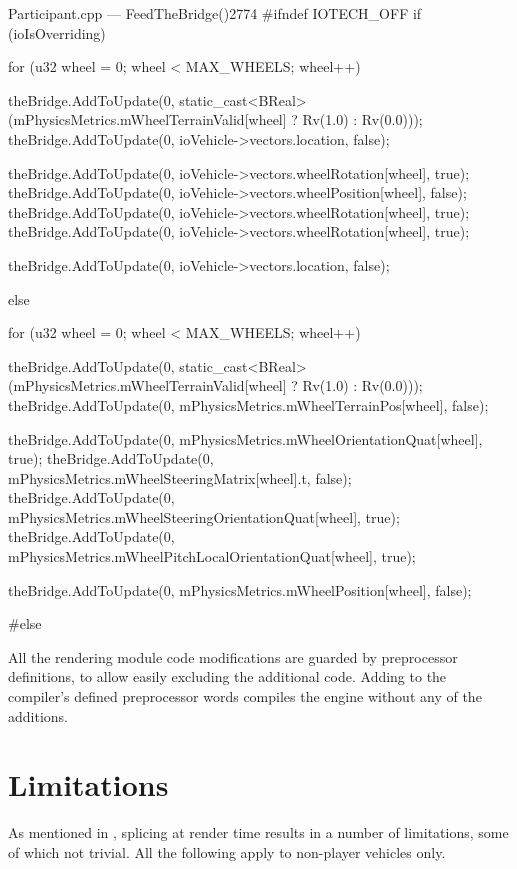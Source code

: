 \begin{codelist}{Participant.cpp --- FeedTheBridge()}{2774}
#ifndef IOTECH_OFF
	if (ioIsOverriding) {
		for (u32 wheel = 0; wheel < MAX_WHEELS; wheel++) {
			theBridge.AddToUpdate(0, static_cast<BReal>(mPhysicsMetrics.mWheelTerrainValid[wheel] ? Rv(1.0) : Rv(0.0)));
			theBridge.AddToUpdate(0, ioVehicle->vectors.location, false);

			theBridge.AddToUpdate(0, ioVehicle->vectors.wheelRotation[wheel], true);
			theBridge.AddToUpdate(0, ioVehicle->vectors.wheelPosition[wheel], false);
			theBridge.AddToUpdate(0, ioVehicle->vectors.wheelRotation[wheel], true);
			theBridge.AddToUpdate(0, ioVehicle->vectors.wheelRotation[wheel], true);

			theBridge.AddToUpdate(0, ioVehicle->vectors.location, false);
		}
	}
	else {
		for (u32 wheel = 0; wheel < MAX_WHEELS; wheel++) {
			theBridge.AddToUpdate(0, static_cast<BReal>(mPhysicsMetrics.mWheelTerrainValid[wheel] ? Rv(1.0) : Rv(0.0)));
			theBridge.AddToUpdate(0, mPhysicsMetrics.mWheelTerrainPos[wheel], false);

			theBridge.AddToUpdate(0, mPhysicsMetrics.mWheelOrientationQuat[wheel], true);
			theBridge.AddToUpdate(0, mPhysicsMetrics.mWheelSteeringMatrix[wheel].t, false);
			theBridge.AddToUpdate(0, mPhysicsMetrics.mWheelSteeringOrientationQuat[wheel], true);
			theBridge.AddToUpdate(0, mPhysicsMetrics.mWheelPitchLocalOrientationQuat[wheel], true);

			theBridge.AddToUpdate(0, mPhysicsMetrics.mWheelPosition[wheel], false);
		}
	}
#else
\end{codelist}

All the rendering module code modifications are guarded by preprocessor definitions, to allow easily excluding the additional code. Adding  to the compiler's defined preprocessor words compiles the engine without any of the additions.

\section{Limitations}\label{sc:integration:limitations}

As mentioned in , splicing at render time results in a number of limitations, some of which not trivial. All the following apply to non-player vehicles only.

